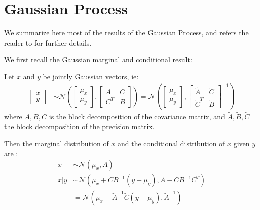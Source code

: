 


\chapter{Gaussian Process}\label{sec:Gaussian Process}

We summarize here most of the results of the Gaussian Process, and refers the reader to \cite{rasmussen_gaussian_2008} for further details.

We first recall the Gaussian marginal and conditional result:

Let $x$ and $y$ be jointly Gaussian vectors, ie:
\begin{align}
    \begin{bmatrix}
        x \\ y
    \end{bmatrix} &\sim \mathcal{N} \left( 
    \begin{bmatrix}
        \mu_x \\ \mu_y
    \end{bmatrix},
        \begin{bmatrix}
            A & C \\
            C^T & B
        \end{bmatrix}
    \right) = \mathcal{N} \left( 
        \begin{bmatrix}
        \mu_x \\ \mu_y
    \end{bmatrix},
        \begin{bmatrix}
            \tilde{A} & \tilde{C} \\
            \tilde{C}^T & \tilde{B}
        \end{bmatrix}^{-1}
    \right)
\end{align}
where $A, B, C$ is the block decomposition of the covariance matrix, and $\tilde{A}, \tilde{B}, \tilde{C}$ the block decomposition of the precision matrix.

Then the marginal distribution of $x$ and the conditional distribution of $x$ given $y$ are :
\begin{align}
    x &\sim \mathcal{N}(\mu_x, A) \\
    x \vert y &\sim \mathcal{N}(\mu_x + CB^{-1}(y-\mu_y), A-CB^{-1}C^T) \\
    &= \mathcal{N}(\mu_x - \tilde{A}^{-1}\tilde{C}(y-\mu_y), \tilde{A}^{-1})
\end{align}

